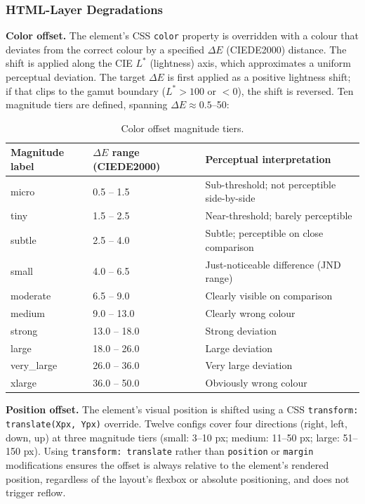 \subsubsection{HTML-Layer Degradations}

\textbf{Color offset.} The element's CSS \texttt{color} property is overridden with a colour that deviates from the correct colour by a specified $\Delta E$ (CIEDE2000) distance. The shift is applied along the CIE $L^*$ (lightness) axis, which approximates a uniform perceptual deviation. The target $\Delta E$ is first applied as a positive lightness shift; if that clips to the gamut boundary ($L^* > 100$ or $< 0$), the shift is reversed. Ten magnitude tiers are defined, spanning $\Delta E \approx 0.5$--50:

\begin{table}[htbp]
\centering
\caption{Color offset magnitude tiers.}
\label{tab:color-tiers}
\begin{tabular}{lll}
\toprule
Magnitude label & $\Delta E$ range (CIEDE2000) & Perceptual interpretation \\
\midrule
micro      & 0.5 -- 1.5  & Sub-threshold; not perceptible side-by-side \\
tiny       & 1.5 -- 2.5  & Near-threshold; barely perceptible \\
subtle     & 2.5 -- 4.0  & Subtle; perceptible on close comparison \\
small      & 4.0 -- 6.5  & Just-noticeable difference (JND range) \\
moderate   & 6.5 -- 9.0  & Clearly visible on comparison \\
medium     & 9.0 -- 13.0 & Clearly wrong colour \\
strong     & 13.0 -- 18.0 & Strong deviation \\
large      & 18.0 -- 26.0 & Large deviation \\
very\_large & 26.0 -- 36.0 & Very large deviation \\
xlarge     & 36.0 -- 50.0 & Obviously wrong colour \\
\bottomrule
\end{tabular}
\end{table}

\textbf{Position offset.} The element's visual position is shifted using a CSS \texttt{transform: translate(Xpx, Ypx)} override. Twelve configs cover four directions (right, left, down, up) at three magnitude tiers (small: 3--10 px; medium: 11--50 px; large: 51--150 px). Using \texttt{transform: translate} rather than \texttt{position} or \texttt{margin} modifications ensures the offset is always relative to the element's rendered position, regardless of the layout's flexbox or absolute positioning, and does not trigger reflow.

